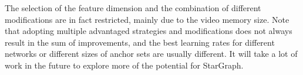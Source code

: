 \documentclass{article}
\begin{document}
The selection of the feature dimension and the combination of different modifications are in fact restricted, mainly due to the video memory size. 
Note that adopting multiple advantaged strategies and modifications does not always result in the sum of improvements, and the best learning rates for different networks or different sizes of  anchor sets are usually different. It will take a lot of work in the future to explore more of the potential for StarGraph.
\end{document}
